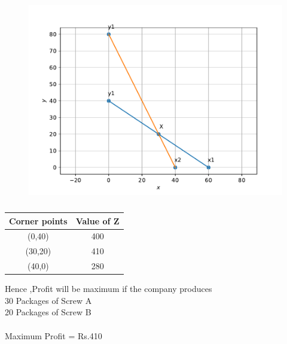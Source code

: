 \documentclass[journal,10pt]{article}
\begin{document}
	\begin{figure}[!ht]
		\centering
		\includegraphics[width=\columnwidth]{12/12/2/5/figs/op1.pdf}
		\caption{}
		\label{fig:12/12/2/5}
  	\end{figure}

\begin{table}[!ht]
\begin{tabular}{|c|c|}
	\hline
	\textbf{Corner points}&\textbf{Value of Z}\\
	\hline
	(0,40)&400\\
    \hline
	(30,20)&410\\
	\hline
	(40,0)&280\\
	\hline
\end{tabular}
	\caption{}
		\label{table:12/12/2/5/1}
\end{table}
\iffalse
Hence ,Profit will be maximum if the company produces\\
30 Packages of Screw A\\
20 Packages of Screw B\\\\
Maximum Profit = Rs.410
\end{document}
